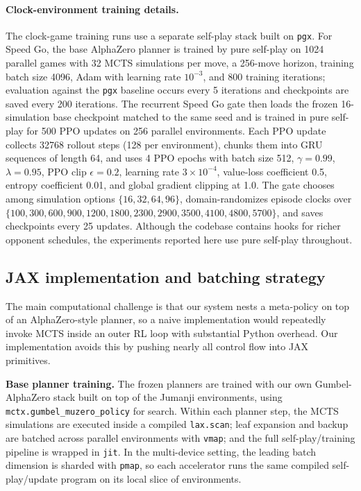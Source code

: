 \documentclass{article}
\begin{document}
\paragraph{Clock-environment training details.}
The clock-game training runs use a separate self-play stack built on
\texttt{pgx}. For Speed Go, the base AlphaZero planner is trained by
pure self-play on 1024 parallel games with 32 MCTS simulations per
move, a 256-move horizon, training batch size 4096, Adam with
learning rate $10^{-3}$, and 800 training iterations; evaluation
against the \texttt{pgx} baseline occurs every 5 iterations and
checkpoints are saved every 200 iterations. The recurrent Speed Go
gate then loads the frozen 16-simulation base checkpoint matched to
the same seed and is trained in pure self-play for 500 PPO updates on
256 parallel environments. Each PPO update collects 32768 rollout
steps (128 per environment), chunks them into GRU sequences of length
64, and uses 4 PPO epochs with batch size 512, $\gamma{=}0.99$,
$\lambda{=}0.95$, PPO clip $\epsilon{=}0.2$, learning rate $3\times
10^{-4}$, value-loss coefficient 0.5, entropy coefficient 0.01, and
global gradient clipping at 1.0. The gate chooses among simulation
options $\{16,32,64,96\}$, domain-randomizes episode clocks over
$\{100,300,600,900,1200,1800,2300,2900,3500,4100,4800,5700\}$, and
saves checkpoints every 25 updates. Although the codebase contains
hooks for richer opponent schedules, the experiments reported here use
pure self-play throughout.

\subsection{JAX implementation and batching strategy}

The main computational challenge is that our system nests a meta-policy on top of
an AlphaZero-style planner, so a naive implementation would repeatedly invoke MCTS
inside an outer RL loop with substantial Python overhead. Our implementation avoids
this by pushing nearly all control flow into JAX primitives.

\textbf{Base planner training.}
The frozen planners are trained with our own Gumbel-AlphaZero stack built on top of
the Jumanji environments, using
\texttt{mctx.gumbel\_muzero\_policy} \citep{deepmind2020jax} for search. Within each planner step, the MCTS
simulations are executed inside a compiled \texttt{lax.scan}; leaf expansion and
backup are batched across parallel environments with \texttt{vmap}; and the full
self-play/training pipeline is wrapped in \texttt{jit}. In the multi-device setting,
the leading batch dimension is sharded with \texttt{pmap}, so each accelerator runs
the same compiled self-play/update program on its local slice of environments.
\end{document}
